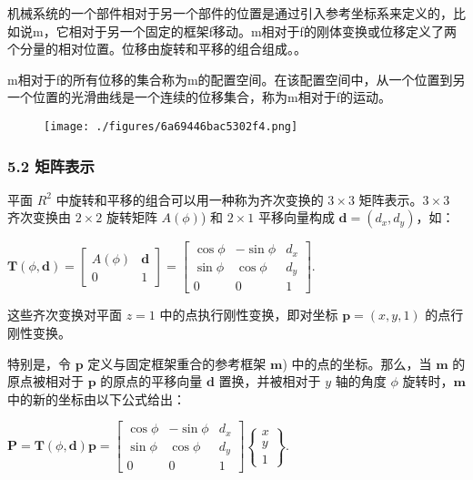 机械系统的一个部件相对于另一个部件的位置是通过引入参考坐标系来定义的，比如说m，它相对于另一个固定的框架f移动。m相对于f的刚体变换或位移定义了两个分量的相对位置。位移由旋转和平移的组合组成。。

m相对于f的所有位移的集合称为m的配置空间。在该配置空间中，从一个位置到另一个位置的光滑曲线是一个连续的位移集合，称为m相对于f的运动。

\begin{figure}[ht]
\centering
\texttt{[image: ./figures/6a69446bac5302f4.png]}
\caption \label{fig_YDX_2}
\end{figure}

\subsubsection{5.2 矩阵表示}

平面 $R^2$ 中旋转和平移的组合可以用一种称为齐次变换的 $3 \times 3 $ 矩阵表示。$ 3 \times 3 $ 齐次变换由 $ 2 \times 2 $ 旋转矩阵 $ A(\phi) $) 和 $2 \times 1 $ 平移向量构成 $\mathbf{d} = (d_x, d_y)$，如：

$\mathbf{T}(\phi, \mathbf{d}) = \begin{bmatrix}A(\phi) & \mathbf{d} \\0 & 1 \end{bmatrix} = \begin{bmatrix}\cos \phi & -\sin \phi & d_x \\\sin \phi & \cos \phi & d_y \\0 & 0 & 1\end{bmatrix}$.

这些齐次变换对平面 $ z=1 $ 中的点执行刚性变换，即对坐标 $\mathbf{p} = (x, y, 1) $ 的点行刚性变换。

特别是，令 $\mathbf{p}$ 定义与固定框架重合的参考框架 $\mathbf{m}$) 中的点的坐标。那么，当 $\mathbf{m}$ 的原点被相对于 $\mathbf{p}$ 的原点的平移向量 $\mathbf{d} $ 置换，并被相对于 $ y $ 轴的角度 $\phi$ 旋转时，$\mathbf{m}$ 中的新的坐标由以下公式给出：

$\mathbf{P} = \mathbf{T}(\phi, \mathbf{d}) \mathbf{p} = \begin{bmatrix}\cos \phi & -\sin \phi & d_x \\\sin \phi & \cos \phi & d_y \\0 & 0 & 1\end{bmatrix}\begin{Bmatrix}x \\ y \\1\end{Bmatrix}$.

